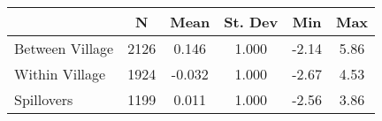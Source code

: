 \begin{tabular}{l*{5}{c}}\hline&\multicolumn{1}{c}{N}&\multicolumn{1}{c}{Mean}&\multicolumn{1}{c}{St. Dev}&\multicolumn{1}{c}{Min}&\multicolumn{1}{c}{Max}\\ \hline 
Between Village & 2126 & 0.146 & 1.000 & -2.14 & 5.86 \\
Within Village & 1924 & -0.032 & 1.000 & -2.67 & 4.53 \\
Spillovers & 1199 & 0.011 & 1.000 & -2.56 & 3.86 \\
\hline \end{tabular}
